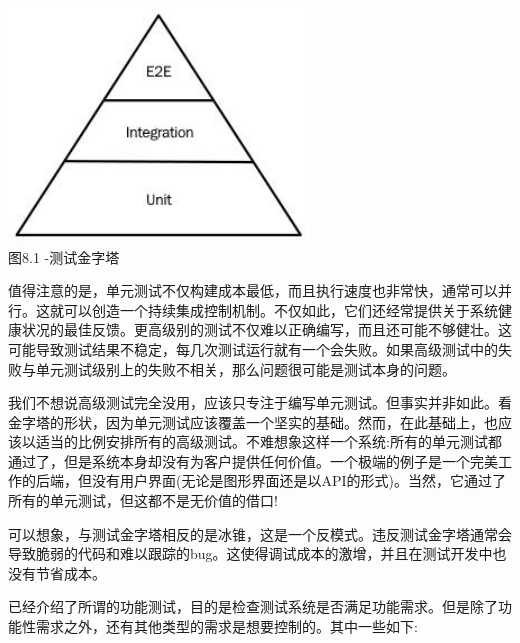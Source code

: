 \begin{center}
\includegraphics[width=0.6\textwidth]{content/3/chapter8/images/1.jpg}\\
图8.1 -测试金字塔
\end{center}

值得注意的是，单元测试不仅构建成本最低，而且执行速度也非常快，通常可以并行。这就可以创造一个持续集成控制机制。不仅如此，它们还经常提供关于系统健康状况的最佳反馈。更高级别的测试不仅难以正确编写，而且还可能不够健壮。这可能导致测试结果不稳定，每几次测试运行就有一个会失败。如果高级测试中的失败与单元测试级别上的失败不相关，那么问题很可能是测试本身的问题。

我们不想说高级测试完全没用，应该只专注于编写单元测试。但事实并非如此。看金字塔的形状，因为单元测试应该覆盖一个坚实的基础。然而，在此基础上，也应该以适当的比例安排所有的高级测试。不难想象这样一个系统:所有的单元测试都通过了，但是系统本身却没有为客户提供任何价值。一个极端的例子是一个完美工作的后端，但没有用户界面(无论是图形界面还是以API的形式)。当然，它通过了所有的单元测试，但这都不是无价值的借口!

可以想象，与测试金字塔相反的是冰锥，这是一个反模式。违反测试金字塔通常会导致脆弱的代码和难以跟踪的bug。这使得调试成本的激增，并且在测试开发中也没有节省成本。


已经介绍了所谓的功能测试，目的是检查测试系统是否满足功能需求。但是除了功能性需求之外，还有其他类型的需求是想要控制的。其中一些如下:

